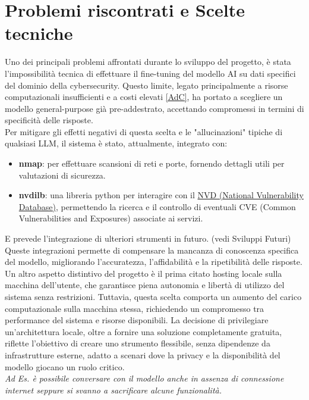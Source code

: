 \documentclass[11pt]{article}
\begin{document}
\section{Problemi riscontrati e Scelte tecniche}
Uno dei principali problemi affrontati durante lo sviluppo del progetto, è stata 
l’impossibilità tecnica di effettuare il fine-tuning del modello AI su dati 
specifici del dominio della cybersecurity\autocite{dataset}. Questo limite, 
legato principalmente a risorse computazionali insufficienti e a costi elevati \ref{AdC}, 
ha portato a scegliere un modello general-purpose già pre-addestrato, 
accettando compromessi in termini di specificità delle risposte.\\
Per mitigare gli effetti negativi di questa scelta e le "allucinazioni" tipiche di qualsiasi
LLM, il sistema è stato, attualmente, integrato con:
\begin{itemize}
    \item \textbf{nmap\autocite{nmap_docs}}: per effettuare scansioni di reti e porte, fornendo dettagli utili per valutazioni di sicurezza.
    \item \textbf{nvdilb\autocite{nvdlib_docs}}: una libreria python per interagire con il \href{https://nvd.nist.gov/}{NVD (National Vulnerability Database)}, permettendo la ricerca e il controllo di eventuali CVE (Common Vulnerabilities and Exposures) associate ai servizi.
\end{itemize}
E prevede l'integrazione di ulteriori strumenti in futuro. (vedi Sviluppi Futuri)\\
Queste integrazioni permette di compensare la mancanza di conoscenza specifica del modello, 
migliorando l'accuratezza, l'affidabilità e la ripetibilità delle risposte.\\
Un altro aspetto distintivo del progetto è il prima citato hosting locale sulla macchina dell’utente, 
che garantisce piena autonomia e libertà di utilizzo del sistema senza restrizioni. 
Tuttavia, questa scelta comporta un aumento del carico computazionale sulla macchina stessa, 
richiedendo un compromesso tra performance del sistema e risorse disponibili. 
La decisione di privilegiare un’architettura locale, oltre a fornire una soluzione completamente 
gratuita, riflette l’obiettivo di creare uno strumento flessibile, 
senza dipendenze da infrastrutture esterne, adatto a scenari dove 
la privacy e la disponibilità del modello giocano un ruolo critico.\\
\textit{Ad Es. è possibile conversare con il modello anche in assenza di connessione internet seppure 
si svanno a sacrificare alcune funzionalità.}
\end{document}
